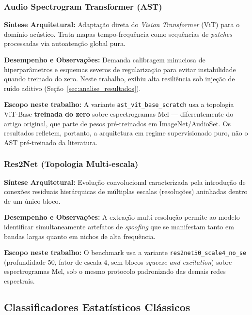\documentclass[12pt,a4paper]{article}
\begin{document}
\subsubsection*{Audio Spectrogram Transformer (AST) \cite{gong2021ast}}
\textbf{Síntese Arquitetural:} Adaptação direta do \textit{Vision Transformer} (ViT) para o domínio acústico. Trata mapas tempo-frequência como sequências de \textit{patches} processadas via autoatenção global pura.
\par\textbf{Desempenho e Observações:} Demanda calibragem minuciosa de hiperparâmetros e esquemas severos de regularização para evitar instabilidade quando treinado do zero. Neste trabalho, exibiu alta resiliência sob injeção de ruído aditivo (Seção~\ref{sec:analise_resultados}).
\par\textbf{Escopo neste trabalho:} A variante \texttt{ast\_vit\_base\_scratch}
usa a topologia ViT-Base \textbf{treinada do zero} sobre espectrogramas Mel
--- diferentemente do artigo original, que parte de pesos pré-treinados em
ImageNet/AudioSet. Os resultados refletem, portanto, a arquitetura em regime
supervisionado puro, não o AST pré-treinado da literatura.

\subsubsection*{Res2Net (Topologia Multi-escala) \cite{gao2021res2net}}
\textbf{Síntese Arquitetural:} Evolução convolucional caracterizada pela introdução de conexões residuais hierárquicas de múltiplas escalas (resoluções) aninhadas dentro de um único bloco.
\par\textbf{Desempenho e Observações:} A extração multi-resolução permite ao modelo identificar simultaneamente artefatos de \textit{spoofing} que se manifestam tanto em bandas largas quanto em nichos de alta frequência.
\par\textbf{Escopo neste trabalho:} O benchmark usa a variante
\texttt{res2net50\_scale4\_no\_se} (profundidade 50, fator de escala 4, sem
blocos \textit{squeeze-and-excitation}) sobre espectrogramas Mel, sob o mesmo
protocolo padronizado das demais redes espectrais.

\subsection{Classificadores Estatísticos Clássicos}
\label{subsec:classicos}
\end{document}
